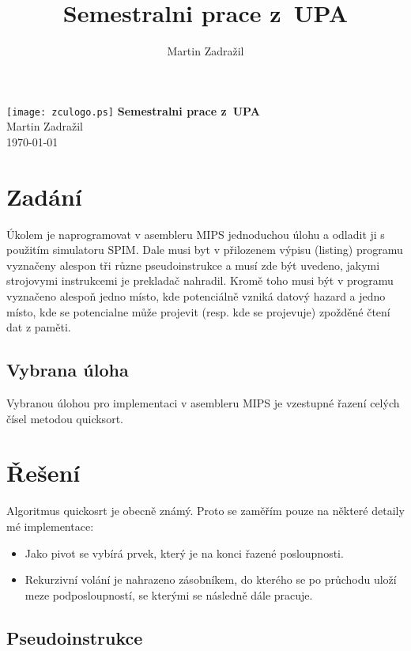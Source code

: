 \documentclass[11pt, titlepage]{article}
\author{Martin Zadražil}
\title{Semestralni prace z~UPA}
\begin{document}
\begin{titlepage}
	\begin{center}
		\texttt{[image: zculogo.ps]}
		\vskip 5cm
		{\huge \bfseries Semestralni prace z~UPA} \\
		\vskip 1cm
		{ \large Martin Zadražil} \\
		{ \large \today }
	\end{center}
\end{titlepage}

\tableofcontents
\newpage

\section{Zadání}

Úkolem je naprogramovat v asembleru MIPS jednoduchou úlohu a odladit ji s použitím simulatoru SPIM.
Dale musi byt v přilozenem výpisu (listing) programu vyznačeny alespon tři různe pseudoinstrukce a musí zde být uvedeno, jakymi strojovymi instrukcemi je prekladač nahradil.
Kromě toho musi být v programu vyznačeno alespoň jedno místo, kde potenciálně vzniká datový hazard a jedno místo, kde se potencialne může projevit (resp. kde se projevuje) zpožděné čtení dat z paměti.

\subsection{Vybrana úloha}

Vybranou úlohou pro implementaci v asembleru MIPS je vzestupné řazení celých čísel metodou quicksort.

\section{Řešení}

Algoritmus quickosrt je obecně známý. Proto se zaměřím pouze na některé detaily mé implementace:
\begin{itemize}
\item Jako pivot se vybírá prvek, který je na konci řazené posloupnosti.
\item Rekurzivní volání je nahrazeno zásobníkem, do kterého se po průchodu uloží meze podposloupností, se kterými se následně dále pracuje.
\end{itemize}

\subsection{Pseudoinstrukce}
\end{document}

